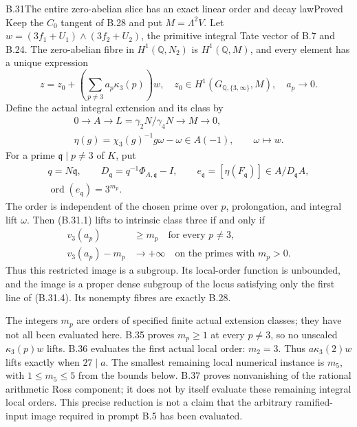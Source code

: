 

\begin{statement}{B.31}{The entire zero-abelian slice has an exact linear order and decay law}{Proved}
Keep the $C_0$ tangent of B.28 and put $M=\Lambda^2V$.
Let $w=(3f_1+U_1)\wedge(3f_2+U_2)$, the primitive
integral Tate vector of B.7 and B.24.
The zero-abelian fibre in $H^1(\mathbb Q,N_2)$ is
$H^1(\mathbb Q,M)$, and every element has a unique
expression
\[
 z=z_0+\left(\sum_{p\ne3}a_p\kappa_3(p)\right)w,
 \quad z_0\in H^1(G_{\mathbb Q,\{3,\infty\}},M),
 \quad a_p\longrightarrow0.                                  \tag{B.31.1}
\]
Define the actual integral extension and its class by
\[
 \begin{gathered}
 0\longrightarrow A\longrightarrow
 L=\gamma_2N/\gamma_4N\longrightarrow M\longrightarrow0,\\
 \eta(g)=\chi_3(g)^{-1}g\omega-\omega\in A(-1),
       \qquad \omega\longmapsto w .
 \end{gathered}                                                 \tag{B.31.2}
\]
For a prime $\mathfrak q\mid p\ne3$ of $K$, put
\[
 \begin{gathered}
 q=N\mathfrak q,\qquad D_{\mathfrak q}=q^{-1}\Phi_{A,\mathfrak q}-I,
 \qquad
 e_{\mathfrak q}=[\eta(F_{\mathfrak q})]
                   \in A/D_{\mathfrak q}A,\\
 \operatorname{ord}(e_{\mathfrak q})=3^{m_p}.
 \end{gathered}                                                 \tag{B.31.3}
\]
The order is independent of the chosen prime over $p$,
prolongation, and integral lift $\omega$.
Then (B.31.1) lifts to intrinsic class three if and only if
\[
 \begin{split}
 v_3(a_p)&\ge m_p\quad\text{for every }p\ne3,\\
 v_3(a_p)-m_p&\longrightarrow+\infty
                    \quad\text{on the primes with }m_p>0.
 \end{split}                                                    \tag{B.31.4}
\]
Thus this restricted image is a subgroup. Its local-order
function is unbounded, and the image is a proper dense
subgroup of the locus satisfying only the first line of
(B.31.4). Its nonempty fibres are exactly B.28.

The integers $m_p$ are orders of specified finite actual
extension classes; they have not all been evaluated here.
B.35 proves $m_p\ge1$ at every $p\ne3$, so no unscaled
$\kappa_3(p)w$ lifts. B.36 evaluates the first actual
local order: $m_2=3$. Thus $a\kappa_3(2)w$ lifts exactly
when $27\mid a$. The smallest remaining local numerical
instance is $m_5$, with $1\le m_5\le5$ from the bounds below.
B.37 proves nonvanishing of the rational arithmetic Ross
component; it does not by itself evaluate these remaining
integral local orders.
This precise reduction is not a claim that the arbitrary
ramified-input image required in prompt B.5 has been evaluated.
\end{statement}
